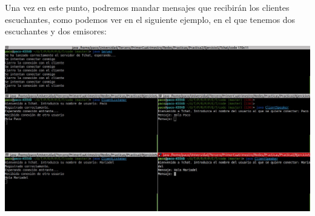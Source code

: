 \documentclass[12pt]{article}       %
\begin{document}
Una vez en este punto, podremos mandar mensajes que recibirán los clientes escuchantes, como podemos ver en el siguiente ejemplo, en el que tenemos dos escuchantes y dos emisores:
\begin{center}
\includegraphics[scale=0.3]{images/Selection_007}
\end{center}
\end{document}
